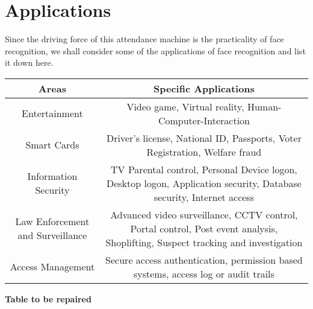 \section{Applications}
Since the driving force of this attendance machine is the practicality of face recognition, we shall consider some of the applications of face recognition and list it down here.
\begin{center}
	\begin{tabular}{| c | c |}
		\hline
		\textbf{Areas} & \textbf{Specific Applications} \\
		\hline
		Entertainment & Video game, Virtual reality, Human-Computer-Interaction \\
		\hline
		Smart Cards & Driver's license, National ID, Passports, Voter Registration, Welfare fraud \\
		\hline
		Information Security & TV Parental control, Personal Device logon,	Desktop logon, Application security, Database security, Internet access \\
		\hline
		Law Enforcement and Surveillance & Advanced video surveillance, CCTV control,
		Portal control, Post event analysis, Shoplifting, Suspect tracking and investigation \\
		\hline
		Access Management & Secure access authentication, permission based systems, access log or audit trails\\
		\hline
	\end{tabular}
	
	\textbf{Table to be repaired}
\end{center}